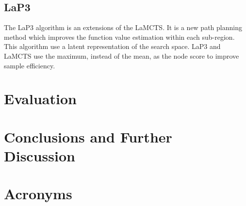 \documentclass[bibliography=totoc]{scrartcl}
\begin{document}
\subsection{LaP3}

The \ac{LaP3} algorithm is an extensions of the LaMCTS. \cite{NEURIPS2021_03a3655f}
It is a new path planning method which improves the function value estimation within each sub-region.
This algorithm use a latent representation of the search space.
\ac{LaP3} and \ac{LaMCTS} use the maximum, instead of the mean, as the node score to improve sample efficiency.

\section{Evaluation}


\section{Conclusions and Further Discussion}


\clearpage


\section*{Acronyms} 

\begin{acronym}[....]
\end{acronym}



\end{document}
